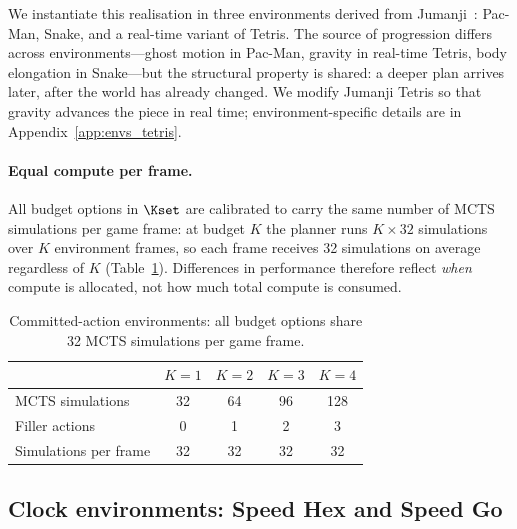 We instantiate this realisation in three environments derived from
Jumanji~\citep{bonnet2024jumanji}: Pac-Man, Snake, and a real-time
variant of Tetris.
The source of progression differs across environments---ghost motion in
Pac-Man, gravity in real-time Tetris, body elongation in Snake---but
the structural property is shared: a deeper plan arrives later, after
the world has already changed.
We modify Jumanji Tetris so that gravity advances the piece in real
time; environment-specific details are in Appendix~\ref{app:envs_tetris}.

\paragraph{Equal compute per frame.}
All budget options in $\Kset$ are calibrated to carry the same number
of MCTS simulations per game frame: at budget $K$ the planner runs
$K \times 32$ simulations over $K$ environment frames, so each frame
receives 32 simulations on average regardless of $K$
(Table~\ref{tab:budget}).
Differences in performance therefore reflect \emph{when} compute is
allocated, not how much total compute is consumed.

\begin{table}[h]
  \centering
  \caption{Committed-action environments: all budget options share 32
    MCTS simulations per game frame.}
  \label{tab:budget}
  \small
  \begin{tabular}{lcccc}
    \toprule
    & $K{=}1$ & $K{=}2$ & $K{=}3$ & $K{=}4$ \\
    \midrule
    MCTS simulations       & 32 & 64 & 96 & 128 \\
    Filler actions         & 0  & 1  & 2  & 3   \\
    Simulations per frame  & 32 & 32 & 32 & 32  \\
    \bottomrule
  \end{tabular}
\end{table}

\subsection{Clock environments: Speed Hex and Speed Go}

